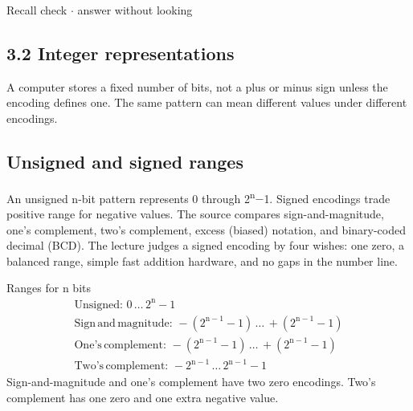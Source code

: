 \documentclass[11pt]{article}
\begin{document}
\begin{keepsection}
\begin{keepsection}
\begin{recallbox}{Recall check \ensuremath{\cdot} answer without looking}
\end{recallbox}
\end{keepsection}
\end{keepsection}

\begin{keepsection}
\section{3.2 Integer representations}

A computer stores a fixed number of bits, not a plus or minus sign unless the encoding defines one. The same pattern can mean different values under different encodings.

\begin{keepsection}
\subsection{Unsigned and signed ranges}

An unsigned n-bit pattern represents 0 through 2\textsuperscript{n}\ensuremath{-}1. Signed encodings trade positive range for negative values. The source compares sign-and-magnitude, one’s complement, two’s complement, excess (biased) notation, and binary-coded decimal (BCD). The lecture judges a signed encoding by four wishes: one zero, a balanced range, simple fast addition hardware, and no gaps in the number line.

\begin{equationcard}{Ranges for n bits}
\[ \begin{gathered} \text{Unsigned}:\, 0\, …\, 2^{\mathrm{n}}-1 \\ \text{Sign}\, \text{and}\, \text{magnitude}:\, -(2^{\mathrm{n}-1}-1)\, …\, +(2^{\mathrm{n}-1}-1) \\ \text{One}’\mathrm{s}\, \text{complement}:\, -(2^{\mathrm{n}-1}-1)\, …\, +(2^{\mathrm{n}-1}-1) \\ \text{Two}’\mathrm{s}\, \text{complement}:\, -2^{\mathrm{n}-1}\, …\, 2^{\mathrm{n}-1}-1 \end{gathered} \]
{\small Sign-and-magnitude and one’s complement have two zero encodings. Two’s complement has one zero and one extra negative value.}
\end{equationcard}


\end{keepsection}
\end{keepsection}
\end{document}
